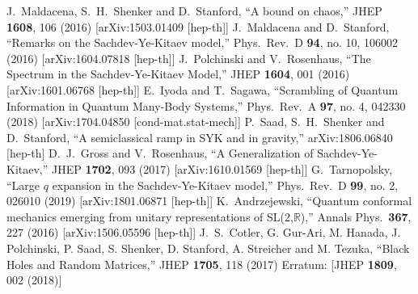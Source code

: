 \begin{thebibliography}{99}
	J.~Maldacena, S.~H.~Shenker and D.~Stanford,
  ``A bound on chaos,''
  JHEP {\bf 1608}, 106 (2016)
  [arXiv:1503.01409 [hep-th]]
	J.~Maldacena and D.~Stanford,
  ``Remarks on the Sachdev-Ye-Kitaev model,''
  Phys.\ Rev.\ D {\bf 94}, no. 10, 106002 (2016)
  [arXiv:1604.07818 [hep-th]]
	J.~Polchinski and V.~Rosenhaus,
  ``The Spectrum in the Sachdev-Ye-Kitaev Model,''
  JHEP {\bf 1604}, 001 (2016)
  [arXiv:1601.06768 [hep-th]]
	E.~Iyoda and T.~Sagawa,
  ``Scrambling of Quantum Information in Quantum Many-Body Systems,''
  Phys.\ Rev.\ A {\bf 97}, no. 4, 042330 (2018)
  [arXiv:1704.04850 [cond-mat.stat-mech]]
	P.~Saad, S.~H.~Shenker and D.~Stanford,
  ``A semiclassical ramp in SYK and in gravity,''
  arXiv:1806.06840 [hep-th]
	D.~J.~Gross and V.~Rosenhaus,
  ``A Generalization of Sachdev-Ye-Kitaev,''
  JHEP {\bf 1702}, 093 (2017)
  [arXiv:1610.01569 [hep-th]]
	G.~Tarnopolsky,
  ``Large $q$ expansion in the Sachdev-Ye-Kitaev model,''
  Phys.\ Rev.\ D {\bf 99}, no. 2, 026010 (2019)
  [arXiv:1801.06871 [hep-th]]
	K.~Andrzejewski,
  ``Quantum conformal mechanics emerging from unitary representations of SL(2,$\mathbb{R}$),''
  Annals Phys.\  {\bf 367}, 227 (2016)
  [arXiv:1506.05596 [hep-th]]
	J.~S.~Cotler, G. Gur-Ari, M. Hanada, J. Polchinski, P. Saad,
	S. Shenker, D. Stanford, A. Streicher and M. Tezuka,
  ``Black Holes and Random Matrices,''
  JHEP {\bf 1705}, 118 (2017)
  Erratum: [JHEP {\bf 1809}, 002 (2018)]

\end{thebibliography}
